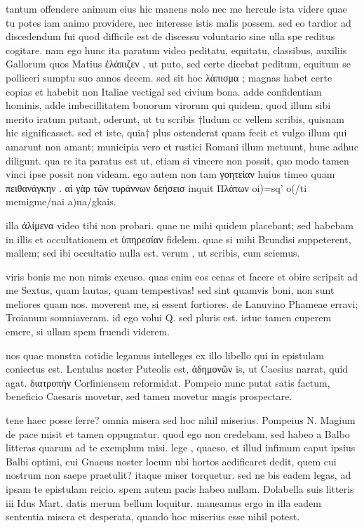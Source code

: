  tantum offendere animum eius hic manens nolo nec me hercule ista videre quae tu potes iam animo providere, nec interesse istis malis possem. sed eo tardior ad discedendum fui quod difficile est de discessu voluntario sine ulla spe reditus cogitare. nam ego hunc ita paratum video peditatu, equitatu, classibus, auxiliis Gallorum quos Matius ἐλάπιζεν , ut puto, sed certe dicebat peditum, equitum se polliceri sumptu suo annos decem. sed sit hoc λάπισμα ; magnas habet certe copias et habebit non Italiae vectigal sed civium bona. adde confidentiam hominis, adde imbecillitatem bonorum virorum qui quidem, quod illum sibi merito iratum putant, oderunt, ut tu scribis †ludum cc vellem scribis, quisnam hic significasset. sed et iste, quia† plus ostenderat quam fecit et vulgo illum qui amarunt non amant; municipia vero et rustici Romani illum metuunt, hunc adhuc diligunt. qua re ita paratus est ut, etiam si vincere non possit, quo modo tamen vinci ipse possit non videam. ego autem non tam γοητείαν huius timeo quam πειθανάγκην . αἱ γὰρ τῶν τυράννων δεήσεισ inquit Πλάτων oi)=sq' o(/ti memigme/nai a)na/gkais.

 illa ἀλίμενα video tibi non probari. quae ne mihi quidem placebant; sed habebam in illis et occultationem et ὑπηρεσίαν fidelem. quae si mihi Brundisi suppeterent, mallem; sed ibi occultatio nulla est. verum , ut scribis, cum sciemus.

 viris bonis me non nimis excuso. quas enim eos cenas et facere et obire scripsit ad me Sextus, quam lautas, quam tempestivas! sed sint quamvis boni, non sunt meliores quam nos. moverent me, si essent fortiores. de Lanuvino Phameae erravi; Troianum somniaveram. id ego volui Q. sed pluris est. istuc tamen cuperem emere, si ullam spem fruendi viderem.

 nos quae monstra cotidie legamus intelleges ex illo libello qui in epistulam coniectus est. Lentulus noster Puteolis est, ἀδημονῶν is, ut Caesius narrat, quid agat. διατροπὴν Corfiniensem reformidat. Pompeio nunc putat satis factum, beneficio Caesaris movetur, sed tamen movetur magis prospectare.

 tene haec posse ferre? omnia misera sed hoc nihil miserius. Pompeius N. Magium de pace misit et tamen oppugnatur. quod ego non credebam, sed habeo a Balbo litteras quarum ad te exemplum misi. lege , quaeso, et illud infimum caput ipsius Balbi optimi, cui Gnaeus noster locum ubi hortos aedificaret dedit, quem cui nostrum non saepe praetulit? itaque miser torquetur. sed ne bis eadem legas, ad ipsam te epistulam reicio. spem autem pacis habeo nullam. Dolabella suis litteris iii Idus Mart. datis merum bellum loquitur. maneamus ergo in illa eadem sententia misera et desperata, quando hoc miserius esse nihil potest.
